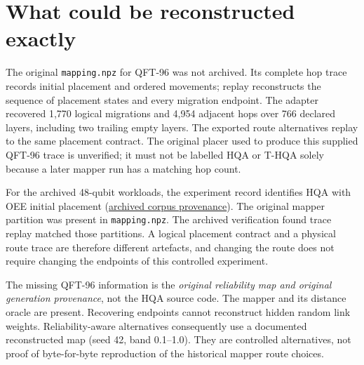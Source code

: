 \documentclass[11pt,a4paper,oneside]{report}
\newcommand{\repo}{https://github.com/sanjeevkrishnaa/Compiler-Driven-ACE}
\newcommand{\snap}{4aa334542e9b9c8fe7a5f9cc8fe48ee2e4d2fa55}
\newcommand{\src}[2]{\href{\repo/blob/\snap/#1}{#2}}
\begin{document}
\section{What could be reconstructed exactly}
The original \texttt{mapping.npz} for QFT-96 was not archived. Its complete hop trace records initial placement and ordered movements; replay reconstructs the sequence of placement states and every migration endpoint. The adapter recovered 1,770 logical migrations and 4,954 adjacent hops over 766 declared layers, including two trailing empty layers. The exported route alternatives replay to the same placement contract. The original placer used to produce this supplied QFT-96 trace is unverified; it must not be labelled HQA or T-HQA solely because a later mapper run has a matching hop count.

For the archived 48-qubit workloads, the experiment record identifies HQA with OEE initial placement (\src{docs/reports/mqt-congestion-study.md}{archived corpus provenance}). The original mapper partition was present in \texttt{mapping.npz}. The archived verification found trace replay matched those partitions. A logical placement contract and a physical route trace are therefore different artefacts, and changing the route does not require changing the endpoints of this controlled experiment.

The missing QFT-96 information is the \emph{original reliability map and original generation provenance}, not the HQA source code. The mapper and its distance oracle are present. Recovering endpoints cannot reconstruct hidden random link weights. Reliability-aware alternatives consequently use a documented reconstructed map (seed 42, band 0.1--1.0). They are controlled alternatives, not proof of byte-for-byte reproduction of the historical mapper route choices.
\end{document}
